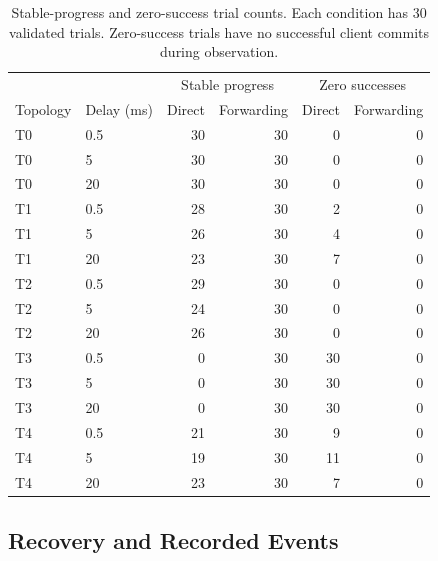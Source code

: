 \begin{table}[H]
  \centering
  \caption{Stable-progress and zero-success trial counts. Each condition has 30 validated trials. Zero-success trials have no successful client commits during observation.}
  \label{tab:progress}
  \begin{tabular}{llrrrr}
    \toprule
    & & \multicolumn{2}{c}{Stable progress} & \multicolumn{2}{c}{Zero successes} \\ Topology & Delay (ms) & Direct & Forwarding & Direct & Forwarding \\
    \midrule
    T0 & 0.5 & 30 & 30 & 0 & 0 \\
    T0 & 5 & 30 & 30 & 0 & 0 \\
    T0 & 20 & 30 & 30 & 0 & 0 \\
    T1 & 0.5 & 28 & 30 & 2 & 0 \\
    T1 & 5 & 26 & 30 & 4 & 0 \\
    T1 & 20 & 23 & 30 & 7 & 0 \\
    T2 & 0.5 & 29 & 30 & 0 & 0 \\
    T2 & 5 & 24 & 30 & 0 & 0 \\
    T2 & 20 & 26 & 30 & 0 & 0 \\
    T3 & 0.5 & 0 & 30 & 30 & 0 \\
    T3 & 5 & 0 & 30 & 30 & 0 \\
    T3 & 20 & 0 & 30 & 30 & 0 \\
    T4 & 0.5 & 21 & 30 & 9 & 0 \\
    T4 & 5 & 19 & 30 & 11 & 0 \\
    T4 & 20 & 23 & 30 & 7 & 0 \\
    \bottomrule
  \end{tabular}
\end{table}

\clearpage
\subsection{Recovery and Recorded Events}

